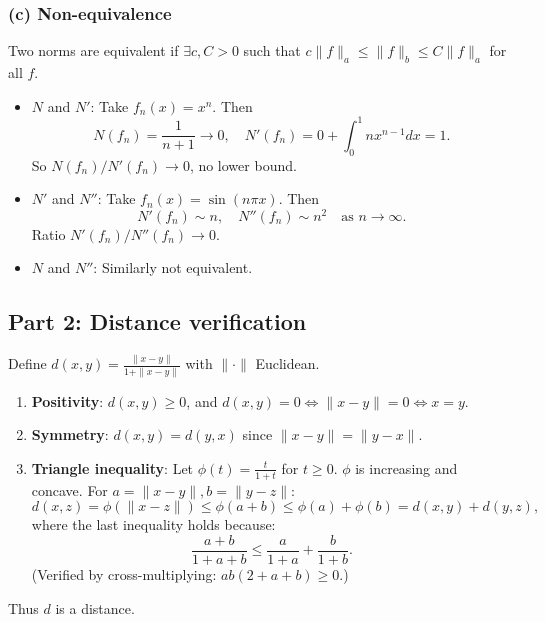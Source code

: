 \documentclass[12pt]{article}
\begin{document}
\begin{answerbox}
\subsubsection*{(c) Non-equivalence}
Two norms are equivalent if \(\exists c,C>0\) such that \(c\|f\|_a \leq \|f\|_b \leq C\|f\|_a\) for all \(f\).

\begin{itemize}
    \item \(N\) and \(N'\): Take \(f_n(x)=x^n\). Then
    \[
    N(f_n)=\frac{1}{n+1} \to 0,\quad N'(f_n)=0 + \int_0^1 nx^{n-1}dx = 1.
    \]
    So \(N(f_n)/N'(f_n) \to 0\), no lower bound.
    
    \item \(N'\) and \(N''\): Take \(f_n(x)=\sin(n\pi x)\). Then
    \[
    N'(f_n) \sim n,\quad N''(f_n) \sim n^2 \quad \text{as } n\to\infty.
    \]
    Ratio \(N'(f_n)/N''(f_n) \to 0\).
    
    \item \(N\) and \(N''\): Similarly not equivalent.
\end{itemize}

\subsection*{Part 2: Distance verification}
Define \(d(x,y)=\frac{\|x-y\|}{1+\|x-y\|}\) with \(\|\cdot\|\) Euclidean.

\begin{enumerate}
    \item \textbf{Positivity}: \(d(x,y)\geq 0\), and \(d(x,y)=0 \Leftrightarrow \|x-y\|=0 \Leftrightarrow x=y\).
    \item \textbf{Symmetry}: \(d(x,y)=d(y,x)\) since \(\|x-y\|=\|y-x\|\).
    \item \textbf{Triangle inequality}: Let \(\phi(t)=\frac{t}{1+t}\) for \(t\geq0\). \(\phi\) is increasing and concave. For \(a=\|x-y\|, b=\|y-z\|\):
    \[
    d(x,z)=\phi(\|x-z\|) \leq \phi(a+b) \leq \phi(a)+\phi(b) = d(x,y)+d(y,z),
    \]
    where the last inequality holds because:
    \[
    \frac{a+b}{1+a+b} \leq \frac{a}{1+a} + \frac{b}{1+b}.
    \]
    (Verified by cross-multiplying: \(ab(2+a+b)\geq0\).)
\end{enumerate}
Thus \(d\) is a distance.
\end{answerbox}

\end{document}
